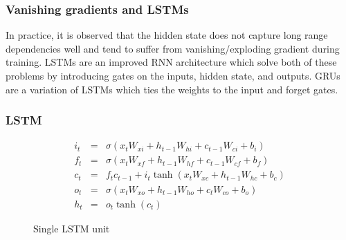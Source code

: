 \subsubsection{Vanishing gradients and LSTMs}

In practice, it is observed that the hidden state does not capture long range
dependencies well and tend to suffer from vanishing/exploding gradient during
training. LSTMs are an improved RNN architecture which solve both of these
problems by introducing gates on the inputs, hidden state, and outputs. GRUs are
a variation of LSTMs which ties the weights to the input and forget gates.


\subsubsection{LSTM}

\begin{eqnarray}
    i_t &=& \sigma(x_t W_{xi} + h_{t-1} W_{hi} + c_{t-1} W_{ci} + b_i) \\
    f_t &=& \sigma(x_t W_{xf} + h_{t-1} W_{hf} + c_{t-1} W_{cf} + b_f) \\
    c_t &=& f_t c_{t-1} + i_t \tanh(x_t W_{xc} + h_{t-1} W_{hc} + b_c) \\
    o_t &=& \sigma(x_t W_{xo} + h_{t-1} W_{ho} + c_t W_{co} + b_o) \\
    h_t &=& o_t \tanh(c_t)
\end{eqnarray}

\begin{figure}[htpb]
\centering

\caption{Single LSTM unit}
    \label{fig:lstm-unit}
\end{figure}

